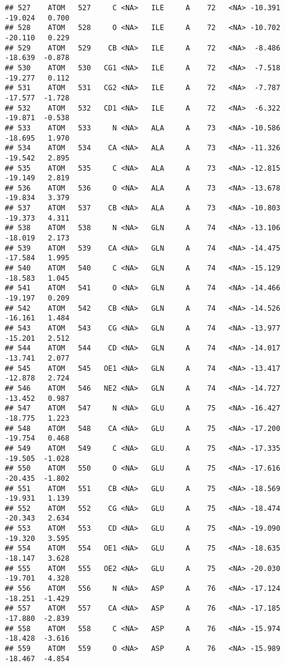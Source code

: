 \documentclass[
]{article}
\begin{document}
\begin{verbatim}
## 527    ATOM   527     C <NA>   ILE     A    72   <NA> -10.391 -19.024   0.700
## 528    ATOM   528     O <NA>   ILE     A    72   <NA> -10.702 -20.110   0.229
## 529    ATOM   529    CB <NA>   ILE     A    72   <NA>  -8.486 -18.639  -0.878
## 530    ATOM   530   CG1 <NA>   ILE     A    72   <NA>  -7.518 -19.277   0.112
## 531    ATOM   531   CG2 <NA>   ILE     A    72   <NA>  -7.787 -17.577  -1.728
## 532    ATOM   532   CD1 <NA>   ILE     A    72   <NA>  -6.322 -19.871  -0.538
## 533    ATOM   533     N <NA>   ALA     A    73   <NA> -10.586 -18.695   1.970
## 534    ATOM   534    CA <NA>   ALA     A    73   <NA> -11.326 -19.542   2.895
## 535    ATOM   535     C <NA>   ALA     A    73   <NA> -12.815 -19.149   2.819
## 536    ATOM   536     O <NA>   ALA     A    73   <NA> -13.678 -19.834   3.379
## 537    ATOM   537    CB <NA>   ALA     A    73   <NA> -10.803 -19.373   4.311
## 538    ATOM   538     N <NA>   GLN     A    74   <NA> -13.106 -18.019   2.173
## 539    ATOM   539    CA <NA>   GLN     A    74   <NA> -14.475 -17.584   1.995
## 540    ATOM   540     C <NA>   GLN     A    74   <NA> -15.129 -18.583   1.045
## 541    ATOM   541     O <NA>   GLN     A    74   <NA> -14.466 -19.197   0.209
## 542    ATOM   542    CB <NA>   GLN     A    74   <NA> -14.526 -16.161   1.484
## 543    ATOM   543    CG <NA>   GLN     A    74   <NA> -13.977 -15.201   2.512
## 544    ATOM   544    CD <NA>   GLN     A    74   <NA> -14.017 -13.741   2.077
## 545    ATOM   545   OE1 <NA>   GLN     A    74   <NA> -13.417 -12.878   2.724
## 546    ATOM   546   NE2 <NA>   GLN     A    74   <NA> -14.727 -13.452   0.987
## 547    ATOM   547     N <NA>   GLU     A    75   <NA> -16.427 -18.775   1.223
## 548    ATOM   548    CA <NA>   GLU     A    75   <NA> -17.200 -19.754   0.468
## 549    ATOM   549     C <NA>   GLU     A    75   <NA> -17.335 -19.505  -1.028
## 550    ATOM   550     O <NA>   GLU     A    75   <NA> -17.616 -20.435  -1.802
## 551    ATOM   551    CB <NA>   GLU     A    75   <NA> -18.569 -19.931   1.139
## 552    ATOM   552    CG <NA>   GLU     A    75   <NA> -18.474 -20.343   2.634
## 553    ATOM   553    CD <NA>   GLU     A    75   <NA> -19.090 -19.320   3.595
## 554    ATOM   554   OE1 <NA>   GLU     A    75   <NA> -18.635 -18.147   3.628
## 555    ATOM   555   OE2 <NA>   GLU     A    75   <NA> -20.030 -19.701   4.328
## 556    ATOM   556     N <NA>   ASP     A    76   <NA> -17.124 -18.251  -1.429
## 557    ATOM   557    CA <NA>   ASP     A    76   <NA> -17.185 -17.880  -2.839
## 558    ATOM   558     C <NA>   ASP     A    76   <NA> -15.974 -18.428  -3.616
## 559    ATOM   559     O <NA>   ASP     A    76   <NA> -15.989 -18.467  -4.854

\end{verbatim}
\end{document}

